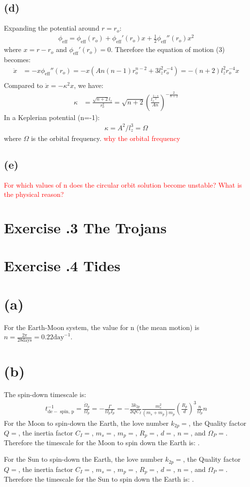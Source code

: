 \documentclass[a4paper,12pt]{article}
\begin{document}
\subsection*{(d)}
Expanding the potential around $r = r_o$:
\begin{align*}
    \phi_{\text{eff}} = \phi_{\text{eff}}(r_o) + \phi_{\text{eff}}'(r_o) x + \frac{1}{2} \phi_{\text{eff}}''(r_o) x^2
\end{align*}
where $x = r - r_o$ and $\phi_{\text{eff}}'(r_o)=0$.
Therefore the equation of motion (3) becomes:
\begin{align*}
    \ddot{x} &= - x \phi_{\text{eff}}''(r_o) = -x(An(n-1)r_o^{n-2} + 3 l_z^2 r_o^{-4}) = -(n+2)l_z^2 r_o^{-4} x \\
\end{align*}
Compared to $\ddot{x} = -\kappa^2 x$, we have:
\begin{align*}
    \kappa &= \frac{\sqrt{n+2} l_z}{r_o^2} = \sqrt{n+2} (\frac{l_z^{\frac{2-n}{2}}}{An})^{-\frac{2}{n+2}}
\end{align*}
In a Keplerian potential (n=-1):
\begin{align*}
    \kappa = A^2 / l_z^3 = \Omega
\end{align*}
where $\Omega$ is the orbital frequency.
\textcolor{red}{why the orbital frequency}

\subsection*{(e)}
\textcolor{red}{For which values of n does the circular orbit solution become unstable? What is the physical
reason?}

\section*{\textbf{Exercise \uppercase\expandafter{}.3 The Trojans}}

\section*{\textbf{Exercise \uppercase\expandafter{}.4 Tides}}
\section*{(a)}
For the Earth-Moon system, the value for n (the mean motion) is $n = \frac{2\pi}{28 \text{days}} = 0.22 \text{day}^{-1}$.

\section*{(b)}
The spin-down timescale is:
\begin{align*}
    t_{\mathrm{de}-\text { spin, } \mathrm{p}}^{-1}=\frac{\dot{\Omega}_p}{\Omega_p}=-\frac{\Gamma}{\Omega_p I_p}=-\frac{3 k_{2 p}}{2 Q C_I} \frac{m_s^2}{\left(m_s+m_p\right) m_p}\left(\frac{R_p}{d}\right)^3 \frac{n}{\Omega_p} n
\end{align*}
For the Moon to spin-down the Earth, the love number $k_{2p} = $, the Quality factor $Q = $, 
the inertia factor $C_I = $, $m_s = $, $m_p = $, $R_p = $, $d = $, $n = $, and $\Omega_P = $. 
Therefore the timescale for the Moon to spin down the Earth is: .

For the Sun to spin-down the Earth, the love number $k_{2p} = $, the Quality factor $Q = $, 
the inertia factor $C_I = $, $m_s = $, $m_p = $, $R_p = $, $d = $, $n = $, and $\Omega_P = $. 
Therefore the timescale for the Sun to spin down the Earth is: .
\end{document}
